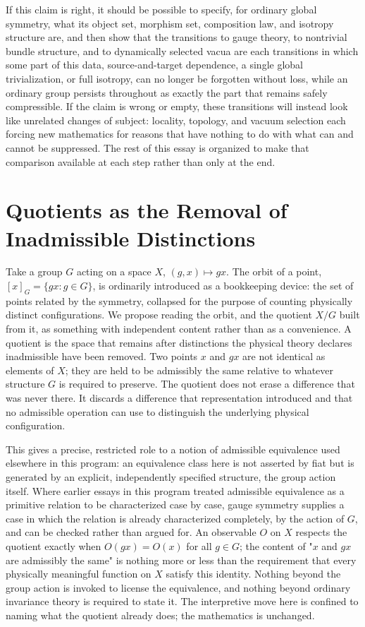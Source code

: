 \documentclass[11pt]{article}
\begin{document}
If this claim is right, it should be possible to specify, for ordinary global symmetry, what its object set, morphism set, composition law, and isotropy structure are, and then show that the transitions to gauge theory, to nontrivial bundle structure, and to dynamically selected vacua are each transitions in which some part of this data, source-and-target dependence, a single global trivialization, or full isotropy, can no longer be forgotten without loss, while an ordinary group persists throughout as exactly the part that remains safely compressible. If the claim is wrong or empty, these transitions will instead look like unrelated changes of subject: locality, topology, and vacuum selection each forcing new mathematics for reasons that have nothing to do with what can and cannot be suppressed. The rest of this essay is organized to make that comparison available at each step rather than only at the end.

\section{Quotients as the Removal of Inadmissible Distinctions}

Take a group $G$ acting on a space $X$, $(g,x) \mapsto gx$. The orbit of a point, $[x]_G = \{gx : g \in G\}$, is ordinarily introduced as a bookkeeping device: the set of points related by the symmetry, collapsed for the purpose of counting physically distinct configurations. We propose reading the orbit, and the quotient $X/G$ built from it, as something with independent content rather than as a convenience. A quotient is the space that remains after distinctions the physical theory declares inadmissible have been removed. Two points $x$ and $gx$ are not identical as elements of $X$; they are held to be admissibly the same relative to whatever structure $G$ is required to preserve. The quotient does not erase a difference that was never there. It discards a difference that representation introduced and that no admissible operation can use to distinguish the underlying physical configuration.

This gives a precise, restricted role to a notion of admissible equivalence used elsewhere in this program: an equivalence class here is not asserted by fiat but is generated by an explicit, independently specified structure, the group action itself. Where earlier essays in this program treated admissible equivalence as a primitive relation to be characterized case by case, gauge symmetry supplies a case in which the relation is already characterized completely, by the action of $G$, and can be checked rather than argued for. An observable $O$ on $X$ respects the quotient exactly when $O(gx) = O(x)$ for all $g \in G$; the content of "$x$ and $gx$ are admissibly the same" is nothing more or less than the requirement that every physically meaningful function on $X$ satisfy this identity. Nothing beyond the group action is invoked to license the equivalence, and nothing beyond ordinary invariance theory is required to state it. The interpretive move here is confined to naming what the quotient already does; the mathematics is unchanged.
\end{document}
